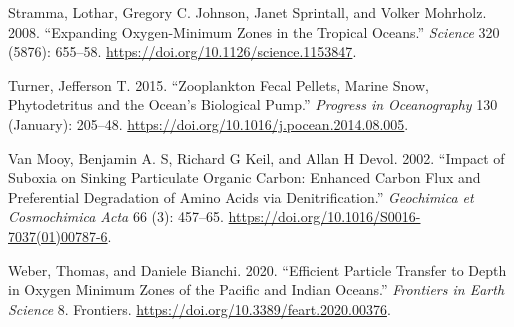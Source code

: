 \documentclass[]{article}
\begin{document}
\leavevmode\hypertarget{ref-strammaExpandingOxygenMinimumZones2008}{}%
Stramma, Lothar, Gregory C. Johnson, Janet Sprintall, and Volker
Mohrholz. 2008. ``Expanding Oxygen-Minimum Zones in the Tropical
Oceans.'' \emph{Science} 320 (5876): 655--58.
\url{https://doi.org/10.1126/science.1153847}.

\leavevmode\hypertarget{ref-turnerZooplanktonFecalPellets2015}{}%
Turner, Jefferson T. 2015. ``Zooplankton Fecal Pellets, Marine Snow,
Phytodetritus and the Ocean's Biological Pump.'' \emph{Progress in
Oceanography} 130 (January): 205--48.
\url{https://doi.org/10.1016/j.pocean.2014.08.005}.

\leavevmode\hypertarget{ref-vanmooyImpactSuboxiaSinking2002}{}%
Van Mooy, Benjamin A. S, Richard G Keil, and Allan H Devol. 2002.
``Impact of Suboxia on Sinking Particulate Organic Carbon: Enhanced
Carbon Flux and Preferential Degradation of Amino Acids via
Denitrification.'' \emph{Geochimica et Cosmochimica Acta} 66 (3):
457--65. \url{https://doi.org/10.1016/S0016-7037(01)00787-6}.

\leavevmode\hypertarget{ref-weberEfficientParticleTransfer2020}{}%
Weber, Thomas, and Daniele Bianchi. 2020. ``Efficient Particle Transfer
to Depth in Oxygen Minimum Zones of the Pacific and Indian Oceans.''
\emph{Frontiers in Earth Science} 8. Frontiers.
\url{https://doi.org/10.3389/feart.2020.00376}.
\end{document}
